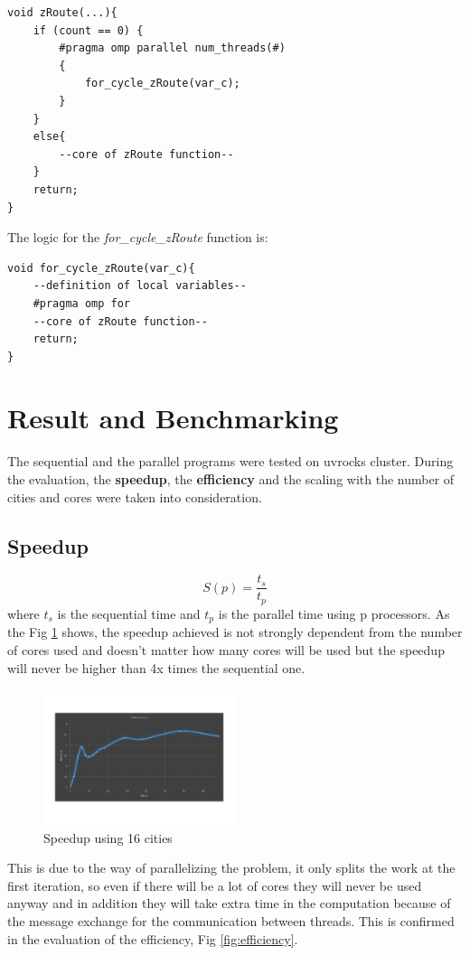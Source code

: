 \documentclass[11pt,conference]{IEEEtran}
\begin{document}
\begin{lstlisting}
void zRoute(...){
    if (count == 0) {
    	#pragma omp parallel num_threads(#)
    	{
    		for_cycle_zRoute(var_c);
    	}
    }
    else{
    	--core of zRoute function--
    }
    return;
}
\end{lstlisting}

The logic for the \textit{for\_cycle\_zRoute} function is:

\begin{lstlisting}
void for_cycle_zRoute(var_c){
    --definition of local variables--
    #pragma omp for
    --core of zRoute function--
    return;
}
\end{lstlisting}
\section{Result and Benchmarking}
The sequential and the parallel programs were tested on uvrocks cluster. During the evaluation, the \textbf{speedup}, the \textbf{efficiency} and the scaling with the number of cities and cores were taken into consideration.
\newline

\subsection{Speedup}
\[ S(p) = \dfrac{t_s}{t_p}  \]
where $t_s$ is the sequential time and $t_p$ is the parallel time using p processors. As the Fig \ref{fig:speedup} shows, the speedup achieved is not strongly dependent from the number of cores used and doesn't matter how many cores will be used but the speedup will never be higher than 4x times the sequential one.

\begin{figure}[h!]
  \centering
    \includegraphics[trim=0.0cm 3.5cm 0.0cm 3.5cm, width=0.5\textwidth]{speedup}
    \caption{Speedup using 16 cities}
    \label{fig:speedup}
\end{figure}

This is due to the way of parallelizing the problem, it only splits the work at the first iteration, so even if there will be a lot of cores they will never be used anyway and in addition they will take extra time in the computation because of the message exchange for the communication between threads. This is confirmed in the evaluation of the efficiency, Fig \ref{fig:efficiency}.
 
\end{document}
